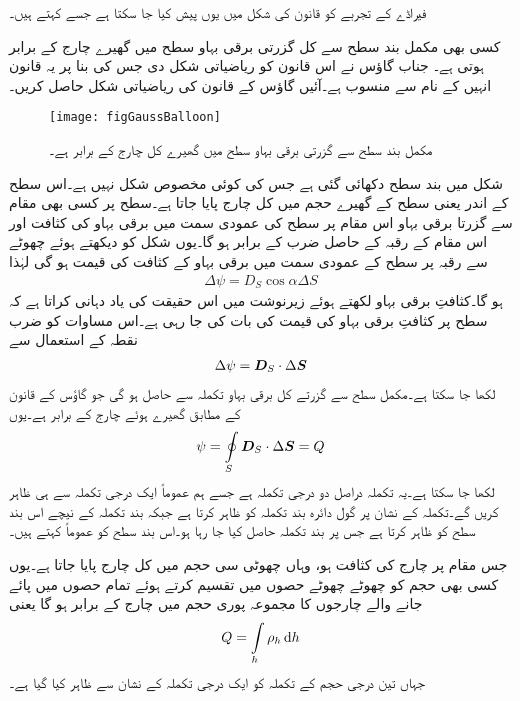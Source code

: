 فیراڈے کے تجربے کو قانون کی شکل میں یوں پیش کیا جا سکتا ہے جسے  کہتے ہیں۔

کسی بھی مکمل بند سطح سے  کل گزرتی برقی بہاو سطح میں گھیرے چارج کے برابر ہوتی ہے۔
جناب گاؤس نے اس قانون کو ریاضیاتی شکل دی جس کی بنا پر یہ قانون انہیں کے نام سے منسوب ہے۔آئیں گاؤس کے قانون کی ریاضیاتی شکل حاصل کریں۔
\begin{figure}
\centering
\texttt{[image: figGaussBalloon]}
\caption{مکمل بند سطح سے گزرتی برقی بہاو سطح میں گھیرے کل چارج کے برابر ہے۔}
\label{شکل_گاؤس_کا_قانون}
\end{figure}

شکل  میں  بند سطح دکھائی گئی ہے جس کی کوئی مخصوص شکل نہیں ہے۔اس سطح کے اندر یعنی سطح کے گھیرے حجم میں کل  چارج  پایا جاتا ہے۔سطح پر کسی بھی مقام سے گزرتا برقی بہاو اس مقام پر سطح کی عمودی سمت میں برقی بہاو کی کثافت اور اس مقام کے رقبہ کے حاصل ضرب کے برابر ہو گا۔یوں شکل کو دیکھتے ہوئے  چھوٹے سے رقبہ  پر سطح کے عمودی سمت میں برقی بہاو کے کثافت  کی قیمت  ہو گی لہٰذا
\begin{align*}
\Delta \psi =D_S \cos \alpha  \Delta S
\end{align*}
ہو گا۔کثافتِ برقی بہاو  لکھتے ہوئے زیرنوشت میں  اس حقیقت کی یاد دہانی کراتا ہے کہ سطح پر کثافتِ برقی بہاو کی قیمت کی بات کی جا رہی ہے۔اس مساوات کو ضرب نقطہ کے استعمال سے
\begin{align*}
\Delta \psi ={{\boldsymbol{D}}}_S \cdot \Delta {\ensuremath{{\boldsymbol{S}}}}
\end{align*}
لکھا جا سکتا ہے۔مکمل سطح سے گزرتے کل برقی بہاو تکملہ سے حاصل ہو گی جو گاؤس کے قانون کے مطابق گھیرے ہوئے چارج  کے برابر ہے۔یوں
\begin{align}
\psi=\oint\limits_{S} {{\boldsymbol{D}}}_S \cdot \Delta {\ensuremath{{\boldsymbol{S}}}}=Q
\end{align}
لکھا جا سکتا ہے۔یہ تکملہ دراصل دو درجی  تکملہ ہے جسے ہم عموماً ایک درجی تکملہ سے ہی ظاہر کریں گے۔تکملہ کے نشان پر گول دائرہ بند تکملہ کو ظاہر کرتا ہے جبکہ بند تکملہ  کے  نیچے  اس بند سطح کو ظاہر کرتا ہے جس پر بند تکملہ حاصل کیا جا رہا ہو۔اس بند سطح کو عموماً  کہتے ہیں۔

جس مقام پر چارج کی کثافت  ہو، وہاں  چھوٹی سی حجم  میں کل چارج   پایا جاتا ہے۔یوں کسی بھی حجم کو چھوٹے چھوٹے حصوں میں تقسیم کرتے ہوئے تمام حصوں میں پائے جانے والے چارجوں کا مجموعہ پوری حجم میں چارج کے برابر ہو گا یعنی
\begin{align}\label{مساوات_گاؤس_کل_حجمی_چارج}
Q=\int\limits_{h} \rho_h \dif h
 \end{align}
جہاں تین درجی حجم کے تکملہ کو ایک درجی تکملہ کے نشان سے ظاہر کیا گیا ہے۔

